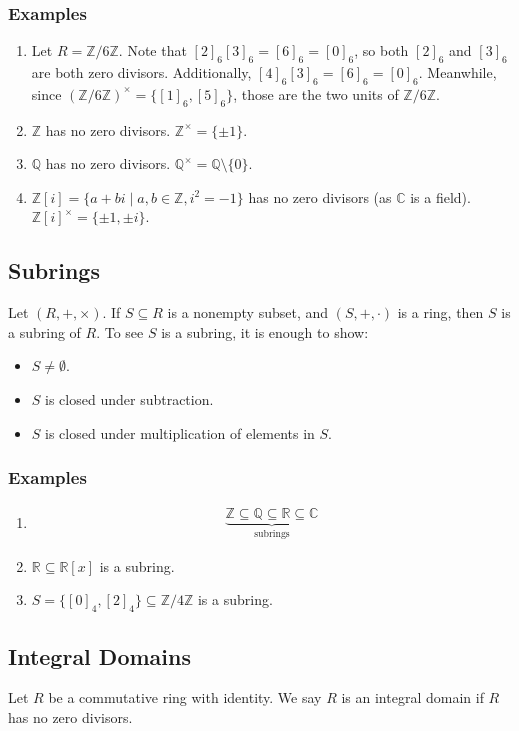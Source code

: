 \documentclass[10pt]{extarticle}
\newcommand{\Q}{\mathbb{Q}}
\newcommand{\Z}{\mathbb{Z}}
\newcommand{\R}{\mathbb{R}}
\newcommand{\C}{\mathbb{C}}
\begin{document}
    \subsubsection{Examples}%
  \begin{enumerate}[(1)]
    \item Let $R = \Z/6\Z$. Note that $[2]_6 [3]_{6} = [6]_{6} = [0]_{6}$, so both $[2]_6$ and $[3]_{6}$ are both zero divisors. Additionally, $[4]_6[3]_6 = [6]_{6} = [0]_{6}$. Meanwhile, since $(\Z/6\Z)^{\times}=\{[1]_{6},[5]_{6}\}$, those are the two units of $\Z/6\Z$.
    \item $\Z$ has no zero divisors. $\Z^{\times} = \{\pm 1\}$.
    \item $\Q$ has no zero divisors. $\Q^{\times} = \Q\setminus \{0\}$.
    \item $\Z[i] = \{a+bi\mid a,b\in\Z,i^2=-1\}$ has no zero divisors (as $\mathbb{C}$ is a field). $\Z[i]^{\times} = \{\pm 1,\pm i\}$.
  \end{enumerate}
  \subsection{Subrings}%
  Let $(R,+,\times)$. If $S\subseteq R$ is a nonempty subset, and $(S,+,\cdot)$ is a ring, then $S$ is a subring of $R$. To see $S$ is a subring, it is enough to show:
  \begin{itemize}
    \item $S\neq \emptyset$.
    \item $S$ is closed under subtraction.
    \item $S$ is closed under multiplication of elements in $S$.
  \end{itemize}
  \subsubsection{Examples}%
  \begin{enumerate}[(1)]
    \item 
    \begin{align*}
      \underbrace{\Z\subseteq\Q\subseteq\R\subseteq \C}_{\text{subrings}}
    \end{align*}
  \item $\R\subseteq \R[x]$ is a subring.
  \item $S = \{[0]_4,[2]_4\}\subseteq \Z/4\Z$ is a subring.
  \end{enumerate}
  \subsection{Integral Domains}%
  Let $R$ be a commutative ring with identity. We say $R$ is an integral domain if $R$ has no zero divisors.
\end{document}
